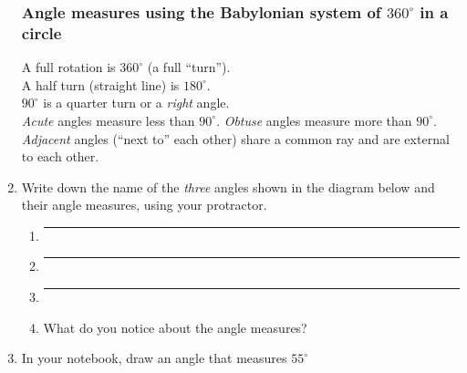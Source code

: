 \documentclass[12pt, twoside]{article}
\begin{document}
\begin{enumerate}
\subsubsection*{Angle measures using the Babylonian system of $360^\circ$ in a circle}
A full rotation is $360^\circ$ (a full ``turn'').\\[0.5cm]
A half turn (straight line) is $180^\circ$. \\[0.5cm]
$90^\circ$ is a quarter turn or a \emph{right} angle. \\[0.5cm]
\emph{Acute} angles measure less than $90^\circ$. \emph{Obtuse} angles measure more than $90^\circ$. \\[0.5cm]
\emph{Adjacent} angles (``next to'' each other) share a common ray and are external to each other. \vspace{0.2cm}

\item Write down the name of the \emph{three} angles shown in the diagram below and their angle measures, using your protractor. \vspace{1cm}
    \begin{center}
    \end{center}
    \begin{enumerate}
      \item  \rule{4cm}{0.15mm} \bigskip
      \item  \rule{4cm}{0.15mm} \bigskip
      \item  \rule{4cm}{0.15mm} \bigskip
      \item What do you notice about the angle measures?
    \end{enumerate}\vspace{1cm}

\item In your notebook, draw an angle that measures $55^\circ$


\end{enumerate}
\end{document}
